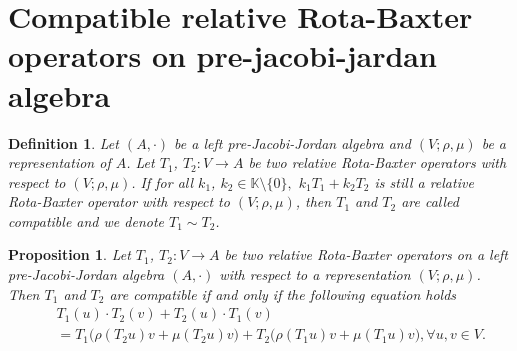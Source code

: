 \documentclass[12pt]{amsart}
\newtheorem{definition}[Theorem]{Definition}
\newtheorem{proposition}[Theorem]{Proposition}
\begin{document}
\section{Compatible relative Rota-Baxter operators on pre-jacobi-jardan algebra}
\begin{definition}Let $ (A,\cdot) $ be a left pre-Jacobi-Jordan algebra and $ (V;\rho,\mu) $ be a representation of $A$. Let $ T_{1} $, $ T_{2}:V\to A $ be two relative Rota-Baxter operators with respect to $ (V;\rho,\mu) $. If for all $ k_{1} $, $ k_{2}\in \mathbb{K}\setminus\{0\},$  $k_{1}T_{1}+k_{2}T_{2}  $ is still a relative Rota-Baxter operator with respect to $ (V;\rho,\mu) $, then $ T_{1} $ and $ T_{2} $ are called compatible and we denote $ T_{1} \sim T_{2}  $.     
\end{definition}
\begin{proposition}
	Let $ T_{1} $, $ T_{2}:V\to A $ be two relative Rota-Baxter operators on a left pre-Jacobi-Jordan algebra $ (A,\cdot) $ with respect to a representation $ (V;\rho,\mu) $. Then $ T_{1} $ and $ T_{2} $ are compatible if and only if the following equation holds 
	\begin{eqnarray}
		&& T_{1}(u)\cdot T_{2}(v)+T_{2}(u)\cdot T_{1}(v)\nonumber\\
		&&=T_{1}\bigg(\rho(T_{2}u)v+\mu(T_{2}u)v\bigg)+T_{2}\bigg(\rho(T_{1}u)v+\mu(T_{1}u)v\bigg), \forall u,v\in V. \label{34} 
	\end{eqnarray} 
\end{proposition}
\end{document}
